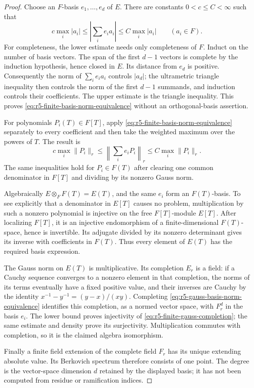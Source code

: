 \documentclass[11pt,a4paper]{article}
\numberwithin{equation}{section}
\theoremstyle{definition}
\theoremstyle{remark}
\begin{document}
\begin{proof}
Choose an $F$-basis $e_1,\ldots,e_d$ of $E$.  There are
constants $0<c\leq C<\infty$ such that
\begin{equation}
 c\max_i|a_i|
       \leq\left|\sum_i e_i a_i\right|
       \leq C\max_i|a_i|\qquad(a_i\in F).
 \label{eq:r5-finite-basis-norm-equivalence}
\end{equation}
For completeness, the lower estimate needs only completeness
of $F$.  Induct on the number of basis vectors.  The span of
the first $d-1$ vectors is complete by the induction hypothesis,
hence closed in $E$.  Its distance from $e_d$ is positive.
Consequently the norm of $\sum_i e_i a_i$ controls $|a_d|$;
the ultrametric triangle inequality then controls the norm of
the first $d-1$ summands, and induction controls their
coefficients.  The upper estimate is the triangle inequality.
This proves \eqref{eq:r5-finite-basis-norm-equivalence} without
an orthogonal-basis assertion.

For polynomials $P_i(T)\in F[T]$, apply
\eqref{eq:r5-finite-basis-norm-equivalence} separately to
every coefficient and then take the weighted maximum over
the powers of $T$.  The result is
\begin{equation}
 c\max_i\|P_i\|_r
   \leq\left\|\sum_i e_iP_i\right\|_r
   \leq C\max_i\|P_i\|_r.
 \label{eq:r5-gauss-basis-norm-equivalence}
\end{equation}
The same inequalities hold for $P_i\in F(T)$ after clearing
one common denominator in $F[T]$ and dividing by its nonzero
Gauss norm.

Algebraically $E\otimes_F F(T)=E(T)$, and the same $e_i$
form an $F(T)$-basis.  To see explicitly that a denominator
in $E[T]$ causes no problem, multiplication by such a nonzero
polynomial is injective on the free $F[T]$-module $E[T]$.
After localizing $F[T]$, it is an injective endomorphism of a
finite-dimensional $F(T)$-space, hence is invertible.  Its
adjugate divided by its nonzero determinant gives its inverse
with coefficients in $F(T)$.  Thus every element of $E(T)$
has the required basis expression.

The Gauss norm on $E(T)$ is multiplicative.  Its completion
$E_r$ is a field: if a Cauchy sequence converges to a nonzero
element in that completion, the norms of its terms eventually
have a fixed positive value, and their inverses are Cauchy by
the identity $x^{-1}-y^{-1}=(y-x)/(xy)$.  Completing
\eqref{eq:r5-gauss-basis-norm-equivalence} identifies this
completion, as a normed vector space, with $F_r^d$ in the
basis $e_i$.  The lower bound proves injectivity of
\eqref{eq:r5-finite-gauss-completion}; the same estimate and
density prove its surjectivity.  Multiplication commutes with
completion, so it is the claimed algebra isomorphism.

Finally a finite field extension of the complete field $F_r$
has its unique extending absolute value.  Its Berkovich
spectrum therefore consists of one point.  The degree is the
vector-space dimension $d$ retained by the displayed basis;
it has not been computed from residue or ramification indices.
\end{proof}
\end{document}
